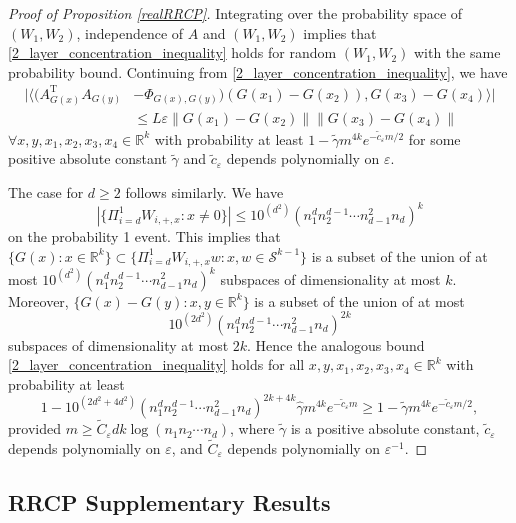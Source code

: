 \documentclass[11pt]{article}
\renewcommand{\epsilon}{\varepsilon}
\newcommand{\R}{\mathbb{R}}
\newcommand{\PiWdix}{\Pi_{i=d}^1 W_{i,+,x}}
\newcommand{\Seps}{\mathcal{S}}
\newcommand{\G}{G}
\renewcommand{\top}{{\mathrm{T}}}
\theoremstyle{remark}
\begin{document}
\begin{proof}[Proof of Proposition \ref{realRRCP}]
Integrating over the probability space of $(W_1,W_2)$, independence of $A$ and $(W_1,W_2)$ implies that  \eqref{2_layer_concentration_inequality} holds for random $(W_1,W_2)$ with the same probability bound.
Continuing from \eqref{2_layer_concentration_inequality}, we have \begin{align}
    |\langle (A_{\G(x)}^\top A_{\G(y)} & - \Phi_{\G(x),\G(y)})(\G(x_1) - \G(x_2)), \G(x_3)-\G(x_4)\rangle | \nonumber \\
    & \leqslant L\epsilon\|\G(x_1) - \G(x_2)\|\|\G(x_3)-\G(x_4)\| \nonumber
\end{align} $\forall x,y ,x_1,x_2,x_3,x_4 \in \R^k$ with probability at least $ 1 - \tilde{\gamma}m^{4k}e^{-\tilde{c}_{\epsilon}m/2 }$ for some positive absolute constant $\tilde{\gamma}$ and $\tilde{c}_{\epsilon}$ depends polynomially on $\epsilon$. 

The case for $d \geqslant 2$ follows similarly. We have 
\[
|\{ \PiWdix : x \neq 0\}| \leqslant 10^{(d^2)} (n_1^d n_2^{d-1} \cdots n_{d-1}^2 n_d)^k
\] on the probability 1 event. This implies that $\{\G(x) : x \in \R^k\} \subset \{\Pi_{i=d}^1W_{i,+,x} w : x,w \in \Seps^{k-1}\}$ is a subset of the union of at most $10^{(d^2)} (n_1^d n_2^{d-1} \cdots n_{d-1}^2 n_d)^k$ subspaces of dimensionality at most $k$. Moreover, $\{\G(x)-\G(y) : x,y \in \R^k\}$ is a subset of the union of at most \[10^{(2d^2)} (n_1^d n_2^{d-1} \cdots n_{d-1}^2 n_d)^{2k}\] subspaces of dimensionality at most $2k$. Hence the analogous bound \eqref{2_layer_concentration_inequality} holds for all $x,y,x_1,x_2,x_3,x_4 \in \R^k$ with probability at least $$1 - 10^{(2d^2 + 4d^2)} (n_1^d n_2^{d-1} \cdots n_{d-1}^2 n_d)^{2k+4k}\hat{\gamma}m^{4k} e^{-\tilde{c}_{\epsilon} m} \geqslant 1 - \tilde{\gamma}m^{4k}e^{-\tilde{c}_{\epsilon} m/2},$$ provided $m \geqslant \tilde{C}_{\epsilon} d k \log(n_1 n_2 \cdots n_d)$, where $\tilde{\gamma}$ is a positive absolute constant, $\tilde{c}_{\epsilon}$ depends polynomially on $\epsilon$, and $\tilde{C}_{\epsilon}$ depends polynomially on $\epsilon^{-1}$. 
    
\end{proof}




\subsection{RRCP Supplementary Results}
\end{document}
